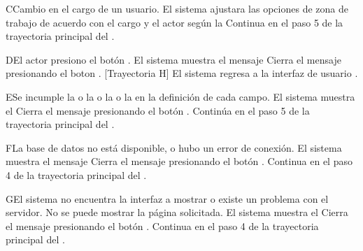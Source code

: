 \begin{UCtrayectoriaA}{C}{Cambio en el cargo de un usuario.}
    \UCpaso     El sistema ajustara las opciones de zona de trabajo de acuerdo con el cargo y el actor según la 
    \UCpaso     Continua en el paso 5 de la trayectoria principal del .
\end{UCtrayectoriaA}


\begin{UCtrayectoriaA}{D}{El actor presiono el botón .}
	\UCpaso El sistema muestra el mensaje 
	\UCpaso[\UCactor] Cierra el mensaje presionando el boton  . [Trayectoria H]
	\UCpaso El sistema regresa a la interfaz de usuario .
\end{UCtrayectoriaA}

\begin{UCtrayectoriaA}{E}{Se incumple la  o la   o la   o la  en la definición de cada campo.}
	\UCpaso El sistema muestra el 
	\UCpaso[\UCactor] Cierra el mensaje presionando el botón .
	\UCpaso Continúa en el paso 5 de la trayectoria principal del .
\end{UCtrayectoriaA}




\begin{UCtrayectoriaA}{F}{La base de datos no está disponible, o hubo un error de conexión.}
    \UCpaso El sistema muestra el mensaje
    \UCpaso[\UCactor] Cierra el mensaje presionando el botón .
    \UCpaso Continua en el paso 4 de la trayectoria principal del .
\end{UCtrayectoriaA}

\begin{UCtrayectoriaA}{G}{El sistema no encuentra la interfaz a mostrar o existe un problema con el servidor.}
    \UCpaso No se puede mostrar la página solicitada.
    \UCpaso El sistema muestra el 
    \UCpaso[\UCactor] Cierra el mensaje presionando el botón .
    \UCpaso Continua en el paso 4 de la trayectoria principal del .
\end{UCtrayectoriaA}

